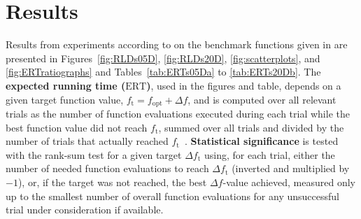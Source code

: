 \documentclass{article}
\newcommand{\ERT}{\ensuremath{\mathrm{ERT}}}
\newcommand{\Df}{\ensuremath{\Delta f}}
\newcommand{\fopt}{\ensuremath{f_\mathrm{opt}}}
\newcommand{\ftarget}{\ensuremath{f_\mathrm{t}}}
\begin{document}
\section{Results}
Results from experiments according to \cite{hansen2010exp} on the benchmark
functions given in \cite{wp200901_2010,hansen2010fun} are presented in 
Figures~\ref{fig:RLDs05D}, \ref{fig:RLDs20D},  
\ref{fig:scatterplots}, and \ref{fig:ERTratiographs} and
Tables~\ref{tab:ERTs05Da} to \ref{tab:ERTs20Db}.
The \textbf{expected running time (\ERT)}, used in the figures and table,
depends on a given target function value, $\ftarget=\fopt+\Df$, and is computed
over all relevant trials as the number of function evaluations executed during
each trial while the best function value did not reach \ftarget, summed over
all trials and divided by the number of trials that actually reached \ftarget\
\cite{hansen2010exp,price1997dev}.
\textbf{Statistical significance} is tested with the rank-sum test for a given
target $\Delta\ftarget$ using, for each trial, either the number of needed
function evaluations to reach $\Delta\ftarget$ (inverted and multiplied by
$-1$), or, if the target was not reached, the best $\Df$-value achieved,
measured only up to the smallest number of overall function evaluations for any
unsuccessful trial under consideration if available.
\end{document}

